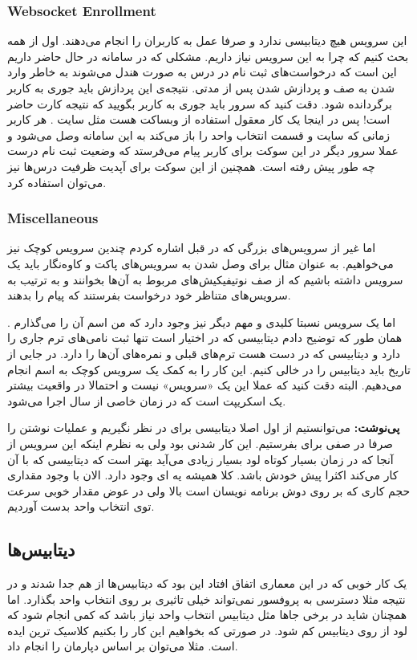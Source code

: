 \subsubsection{Websocket Enrollment}
این سرویس هیچ دیتابیسی ندارد و صرفا عمل
به کاربران را انجام می‌دهند. اول از همه بحث کنیم که چرا به این سرویس نیاز داریم.
مشکلی که در سامانه در حال حاضر داریم این است که درخواست‌های ثبت نام در درس به صورت
هندل می‌شوند به خاطر وارد شدن به صف و پردازش شدن پس از مدتی. نتیجه‌ی این پردازش باید جوری به کاربر
برگردانده شود. دقت کنید که سرور باید جوری به کاربر بگویید که نتیجه کارت حاضر است!
پس در اینجا یک کار معقول استفاده از وبساکت هست مثل سایت
.
هر کاربر زمانی که سایت و قسمت انتخاب واحد را باز می‌کند به این سامانه وصل می‌شود و عملا سرور دیگر
در این سوکت برای کاربر پیام می‌فرستد که وضعیت ثبت نام درست چه طور پیش رفته است.
همچنین از این سوکت برای آپدیت ظرفیت درس‌ها نیز می‌توان استفاده کرد.
\subsubsection{Miscellaneous}
اما غیر از سرویس‌های بزرگی که در قبل اشاره کردم چندین سرویس کوچک نیز می‌خواهیم. به عنوان مثال برای وصل شدن
به سرویس‌های پاکت و کاوه‌نگار باید یک سرویس داشته باشیم که از صف نوتیفیکیش‌های مربوط به آن‌ها بخوانند
و به ترتیب به سرویس‌های متناظر خود درخواست بفرستند که پیام را بدهند.

اما یک سرویس نسبتا کلیدی و مهم دیگر نیز وجود دارد که من اسم آن را می‌گذارم
.
همان طور که توضیح دادم دیتابیسی که در اختیار
است تنها ثبت نامی‌های ترم جاری را دارد و دیتابیسی که در دست
هست ترم‌های قبلی و نمره‌های آن‌ها را دارد. در جایی از تاریخ باید دیتابیس
 را در  خالی کنیم.
این کار را به کمک یک سرویس کوچک به اسم
انجام می‌دهیم. البته دقت کنید که عملا این یک
«سرویس»
نیست و احتمالا در واقعیت بیشتر یک اسکریپت است که در زمان خاصی از سال اجرا می‌شود.

\textbf{پی‌نوشت:}
می‌توانستیم از اول اصلا دیتابیسی برای
در نظر نگیریم و عملیات نوشتن را صرفا در صفی برای
بفرستیم. این کار شدنی بود ولی به نظرم اینکه این سرویس از آنجا که در زمان بسیار کوتاه لود بسیار زیادی
می‌آید بهتر است که دیتابیسی که با آن کار می‌کند اکثرا پیش خودش باشد. کلا همیشه یه
ای
وجود دارد. الان با وجود
مقداری حجم کاری که بر روی دوش برنامه نویسان است بالا ولی در عوض مقدار خوبی سرعت توی انتخاب واحد بدست آوردیم.

\subsection{دیتابیس‌ها}
یک کار خوبی که در این معماری اتفاق افتاد این بود که دیتابیس‌ها از هم جدا شدند و در نتیجه
مثلا دسترسی به پروفسور نمی‌تواند خیلی تاثیری بر روی انتخاب واحد بگذارد. اما همچنان شاید در
برخی جا‌ها مثل دیتابیس انتخاب واحد نیاز باشد که کمی
انجام شود که لود از روی دیتابیس کم شود. در صورتی که بخواهیم این کار را بکنیم کلاسیک ترین ایده
است. مثلا می‌توان بر اساس دپارمان
را انجام داد.

